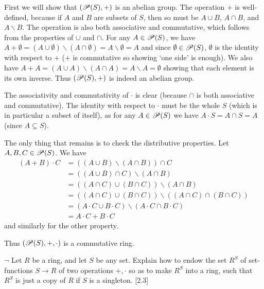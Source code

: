 \begin{solution}
	First we will show that $(\mathscr{P}(S), +)$ is an abelian group. The operation $+$ is well-defined, because if $A$ and $B$ are subsets of $S$, then so must be $A \cup B$, $A \cap B$, and $A \smallsetminus B$. The operation is also both associative and commutative, which follows from the properties of $\cup$ and $\cap$. For any $A \in \mathscr{P}(S)$, we have $A + \emptyset = (A \cup \emptyset) \smallsetminus (A \cap \emptyset) = A \smallsetminus \emptyset = A$ and since $\emptyset \in \mathscr{P}(S)$, $\emptyset$ is the identity with respect to $+$ ($+$ is commutative so showing `one side' is enough). We also have $A + A = (A \cup A) \smallsetminus (A \cap A) = A \smallsetminus A = \emptyset$ showing that each element is its own inverse. Thus $(\mathscr{P}(S), +)$ is indeed an abelian group.
	
	The associativity and commutativity of $\cdot$ is clear (because $\cap$ is both associative and commutative). The identity with respect to $\cdot$ must be the whole $S$ (which is in particular a subset of itself), as for any $A \in \mathscr{P}(S)$ we have $A \cdot S = A \cap S = A$ (since $A \subseteq S$).
	
	The only thing that remains is to check the distributive properties. Let $A, B, C \in \mathscr{P}(S)$. We have
	\begin{align*}
		(A + B) \cdot C &= ((A \cup B) \smallsetminus (A \cap B)) \cap C \\
		&= ((A \cup B) \cap C) \smallsetminus (A \cap B) \\
		&= ((A \cap C) \cup (B \cap C)) \smallsetminus (A \cap B) \\
		&= ((A \cap C) \cup (B \cap C)) \smallsetminus ((A \cap C) \cap (B \cap C)) \\
		&= (A \cdot C \cup B \cdot C) \smallsetminus (A \cdot C \cap B \cdot C) \\
		&= A \cdot C + B \cdot C
	\end{align*}
	and similarly for the other property.
	
	Thus $(\mathscr{P}(S), +, \cdot)$ is a commutative ring.
\end{solution}

\begin{problem}
	$\neg$ Let $R$ be a ring, and let $S$ be any set. Explain how to endow the set $R^S$ of set-functions $S \to R$ of two operations $+, \cdot$ so as to make $R^S$ into a ring, such that $R^S$ is just a copy of $R$ if $S$ is a singleton. [2.3]
\end{problem}

